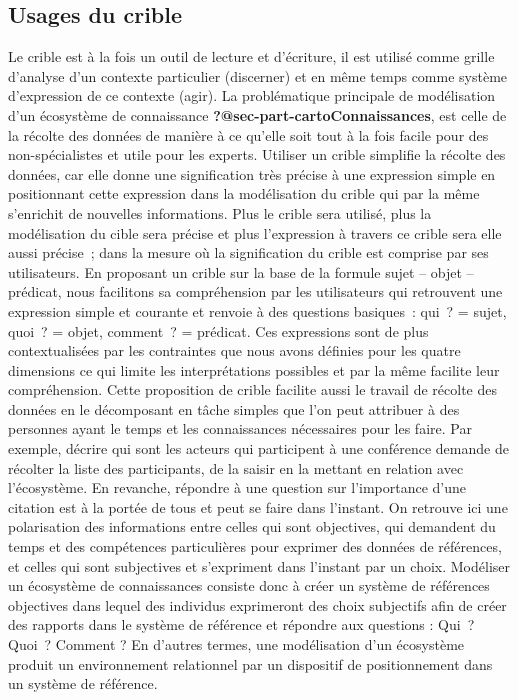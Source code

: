 \documentclass[
  letterpaper,
  DIV=11,
  numbers=noendperiod]{scrreprt}
\begin{document}
\hypertarget{sec-usageCrible}{%
\subsection{Usages du crible}\label{sec-usageCrible}}

Le crible est à la fois un outil de lecture et d'écriture, il est
utilisé comme grille d'analyse d'un contexte particulier (discerner) et
en même temps comme système d'expression de ce contexte (agir). La
problématique principale de modélisation d'un écosystème de connaissance
\textbf{?@sec-part-cartoConnaissances}, est celle de la récolte des
données de manière à ce qu'elle soit tout à la fois facile pour des
non-spécialistes et utile pour les experts. Utiliser un crible simplifie
la récolte des données, car elle donne une signification très précise à
une expression simple en positionnant cette expression dans la
modélisation du crible qui par la même s'enrichit de nouvelles
informations. Plus le crible sera utilisé, plus la modélisation du cible
sera précise et plus l'expression à travers ce crible sera elle aussi
précise~; dans la mesure où la signification du crible est comprise par
ses utilisateurs. En proposant un crible sur la base de la formule sujet
-- objet -- prédicat, nous facilitons sa compréhension par les
utilisateurs qui retrouvent une expression simple et courante et renvoie
à des questions basiques~: qui~? = sujet, quoi~? = objet, comment~? =
prédicat. Ces expressions sont de plus contextualisées par les
contraintes que nous avons définies pour les quatre dimensions ce qui
limite les interprétations possibles et par la même facilite leur
compréhension. Cette proposition de crible facilite aussi le travail de
récolte des données en le décomposant en tâche simples que l'on peut
attribuer à des personnes ayant le temps et les connaissances
nécessaires pour les faire. Par exemple, décrire qui sont les acteurs
qui participent à une conférence demande de récolter la liste des
participants, de la saisir en la mettant en relation avec l'écosystème.
En revanche, répondre à une question sur l'importance d'une citation est
à la portée de tous et peut se faire dans l'instant. On retrouve ici une
polarisation des informations entre celles qui sont objectives, qui
demandent du temps et des compétences particulières pour exprimer des
données de références, et celles qui sont subjectives et s'expriment
dans l'instant par un choix. Modéliser un écosystème de connaissances
consiste donc à créer un système de références objectives dans lequel
des individus exprimeront des choix subjectifs afin de créer des
rapports dans le système de référence et répondre aux questions : Qui~?
Quoi~? Comment ? En d'autres termes, une modélisation d'un écosystème
produit un environnement relationnel par un dispositif de positionnement
dans un système de référence.
\end{document}
